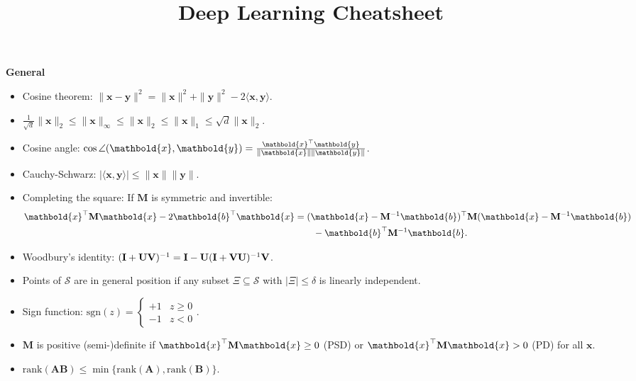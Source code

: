 \documentclass[10pt]{article}
\title{Deep Learning Cheatsheet}
\newenvironment{subtopic}[1]
{\vspace{0.1cm} \begin{center}\textbf{\footnotesize \sffamily #1}\end{center}}
{}
\renewcommand{\mat}[1]{\ensuremath{\mathbf{#1}}}
\renewcommand{\vec}[1]{\ensuremath{\mathbold{#1}}}
\begin{document}
\setlength{\columnsep}{0.25cm}

\begin{multicols*}{3}

    \scriptsize

    \begin{subtopic}{General}
        \begin{itemize}[left=0pt]
            \item Cosine theorem: $\| \vec{x}-\vec{y} \|^2 = \| \vec{x} \|^2 + \| \vec{y} \|^2 - 2\langle \vec{x},\vec{y} \rangle$.
            \item $\frac{1}{\sqrt{d}} \| \vec{x} \|_2 \leq \| \vec{x} \|_{\infty} \leq \| \vec{x} \|_2 \leq \| \vec{x} \|_1 \leq \sqrt{d} \| \vec{x} \|_2$.
            \item Cosine angle: $\cos \angle{(\vec{x},\vec{y})} = \frac{\transpose{\vec{x}} \vec{y}}{\| \vec{x} \| \|
                        \vec{y} \|}$.
            \item Cauchy-Schwarz: $|\langle \vec{x}, \vec{y} \rangle| \leq \| \vec{x} \| \| \vec{y} \|$.
            \item Completing the square: If $\mat{M}$ is symmetric and invertible:
                \begin{align*}
                    \transpose{\vec{x}} \mat{M} \vec{x} - 2 \transpose{\vec{b}} \vec{x} & = \transpose{(\vec{x} - \inv{\mat{M}} \vec{b})} \mat{M} (\vec{x} - \inv{\mat{M}} \vec{b}) \\
                                                                                        & \quad \quad - \transpose{\vec{b}} \inv{\mat{M}} \vec{b}.
                \end{align*}
            \item Woodbury's identity: $\inv{(\mat{I} + \mat{U} \mat{V})} = \mat{I} - \mat{U} \inv{(\mat{I} + \mat{V} \mat{U})} \mat{V}$.
            \item Points of $\mathcal{S}$ are in general position if any subset $\Xi \subseteq \mathcal{S}$ with
                $|\Xi| \leq \delta$ is linearly independent.
            \item Sign function: $\mathrm{sgn}(z) = \begin{cases} +1 & z \geq 0 \\ -1 & z < 0 \end{cases}$.
            \item $\mat{M}$ is positive (semi-)definite if $\transpose{\vec{x}} \mat{M} \vec{x} \geq 0$ (PSD) or $\transpose{\vec{x}} \mat{M} \vec{x} > 0$ (PD) for all $\vec{x}$.
            \item $\mathrm{rank}(\mat{A}\mat{B}) \leq \min \{ \mathrm{rank}(\mat{A}), \mathrm{rank}(\mat{B}) \}$. \\

\end{itemize}
\end{subtopic}
\end{multicols*}
\end{document}
